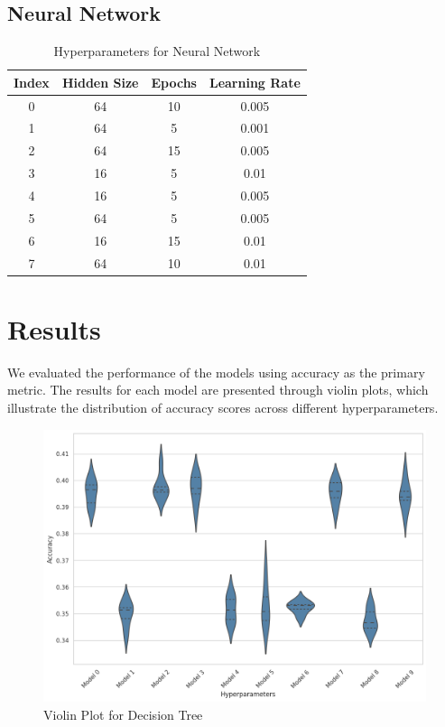 \documentclass[twocolumn]{article}
\begin{document}
\subsection{Neural Network}
\begin{table}[h!]
    \centering
    \begin{tabular}{@{}cccc@{}}
        \toprule
        \textbf{Index} & \textbf{Hidden Size} & \textbf{Epochs} & \textbf{Learning Rate} \\ \midrule
        0 & 64 & 10 & 0.005 \\
        1 & 64 & 5 & 0.001 \\
        2 & 64 & 15 & 0.005 \\
        3 & 16 & 5 & 0.01 \\
        4 & 16 & 5 & 0.005 \\
        5 & 64 & 5 & 0.005 \\
        6 & 16 & 15 & 0.01 \\
        7 & 64 & 10 & 0.01 \\ \bottomrule
    \end{tabular}
    \caption{Hyperparameters for Neural Network}
\end{table}

\section{Results}
We evaluated the performance of the models using accuracy as the primary metric. The results for each model are presented through violin plots, which illustrate the distribution of accuracy scores across different hyperparameters.

\begin{figure}[h!]
    \centering
    \includegraphics[width=\columnwidth]{images/violin_plot_decision_tree.png}
    \caption{Violin Plot for Decision Tree}
    \label{fig:decision_tree_violin}
\end{figure}
\end{document}
